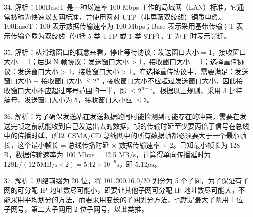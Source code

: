 \documentclass[UTF8,11pt]{ctexart}
\begin{document}
34. 解析：100BaseT 是一种以速率 100 Mbps 工作的局域网（LAN）标准，它通常被称为快速以太网标准，并使用两对 UTP（非屏蔽双绞线）铜质电缆。100BaseT：100 表示数据传输速率为 100 Mbps；Base 表示采用基带传输；T 表示传输介质为双绞线（包括 5 类 UTP 或 1 类 STP），T 为 F 时表示光纤。


35. 解析：从滑动窗口的概念来看，停止等待协议：发送窗口大小 = 1，接收窗口大小 = 1；后退 N 帧协议：发送窗口大小 > 1，接收窗口大小 = 1；选择重传协议：发送窗口大小 > 1，接收窗口大小 > 1。在选择重传协议中，需要满足：发送窗口大小 + 接收窗口大小 \(\displaystyle \le 2^n\)；接收窗口大小不应超过发送窗口大小，因此接收窗口大小不应超过序号范围的一半，即 \(\displaystyle \le 2^{n-1}\)。根据以上规则，采用 3 比特编号，发送窗口大小为 5，接收窗口大小应 \(\displaystyle \le 3\)。


36. 解析：为了确保发送站在发送数据的同时能检测到可能存在的冲突，需要在发送完帧之前就能收到自己发送出去的数据，帧的传输时延至少要两倍于信号在总线中的传播时延，所以 CSMA/CD 总线网中的所有数据帧都必须要大于一个最小帧长，这个最小帧长 = 总线传播时延 \(\displaystyle \times\) 数据传输速率 \(\displaystyle \times\) 2。已知最小帧长为 128 B，数据传输速率为 100 Mbps = 12.5 MB/s，计算得单向传播延时为 \(\displaystyle 128\mathrm{B}/(12.5\mathrm{MB/s}\times2)=5.12\times10^{-6}\mathrm{s}\)，即 \(\displaystyle 5.12\mu\mathrm{s}\)。


37. 解析：网络前缀为 20 位，将 101.200.16.0/20 划分为 5 个子网，为了保证有子网的可分配 IP 地址数尽可能小，即要让其他子网可分配 IP 地址数尽可能大，不能采用平均划分的方法，而要采用变长的子网划分方法，也就是最大子网用 1 位子网号，第二大子网用 2 位子网号，以此类推。
\end{document}
